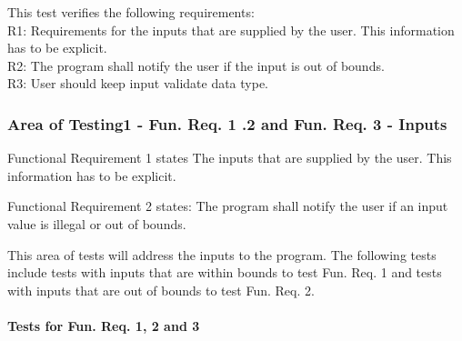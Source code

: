 \documentclass[12pt, titlepage]{article}
\begin{document}
This test verifies the following requirements: \\
\indent  R1: Requirements for the inputs that are supplied by the user. This information has to be
explicit.\\
\indent  R2: The program shall notify the user if the input is out of bounds.\\
\indent R3: User should keep input validate data type.\\		
\subsubsection{Area of Testing1 - Fun. Req. 1 .2 and Fun. Req. 3 - Inputs}\label{test_input}

Functional Requirement 1 states The inputs that are supplied by the user. This information has to be
explicit.

Functional Requirement 2 states: The program shall notify the user if an input value is illegal or out of bounds.

This area of tests will address the inputs to the program. The following tests include  tests with inputs that are within bounds to test Fun. Req. 1 and tests with inputs that are out of bounds to test Fun. Req. 2.

\paragraph{Tests for Fun. Req. 1, 2 and 3}
\end{document}
